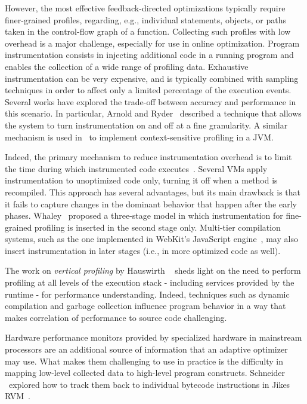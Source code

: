 However, the most effective feedback-directed optimizations typically require finer-grained profiles, regarding, e.g., individual statements, objects, or paths taken in the control-flow graph of a function. Collecting such profiles with low overhead is a major challenge, especially for use in online optimization. Program instrumentation consists in injecting additional code in a running program and enables the collection of a wide range of profiling data. Exhaustive instrumentation can be very expensive, and is typically combined with sampling techniques in order to affect only a limited percentage of the execution events. Several works have explored the trade-off between accuracy and performance in this scenario. In particular, Arnold and Ryder~\cite{Arnold01} described a technique that allows the system to turn instrumentation on and off at a fine granularity. A similar mechanism is used in~\cite{Zhuang06} to implement context-sensitive profiling in a JVM.

Indeed, the primary mechanism to reduce instrumentation overhead is to limit the time during which instrumented code executes~\cite{Arnold05}. Several VMs apply instrumentation to unoptimized code only, turning it off when a method is recompiled. This approach has several advantages, but its main drawback is that it fails to capture changes in the dominant behavior that happen after the early phases. Whaley~\cite{Whaley01} proposed a three-stage model in which instrumentation for fine-grained profiling is inserted in the second stage only. Multi-tier compilation systems, such as the one implemented in WebKit's JavaScript engine~\cite{Pizlo14}, may also insert instrumentation in later stages (i.e., in more optimized code as well).

The work on {\em vertical profiling} by Hauswirth \etal~\cite{Hauswirth04} sheds light on the need to perform profiling at all levels of the execution stack - including services provided by the runtime - for performance understanding. Indeed, techniques such as dynamic compilation and garbage collection influence program behavior in a way that makes correlation of performance to source code challenging.

Hardware performance monitors provided by specialized hardware in mainstream processors are an additional source of information that an adaptive optimizer may use. What makes them challenging to use in practice is the difficulty in mapping low-level collected data to high-level program constructs. Schneider \etal\ explored how to track them back to individual bytecode instructions in Jikes RVM~\cite{Schneider07}.

